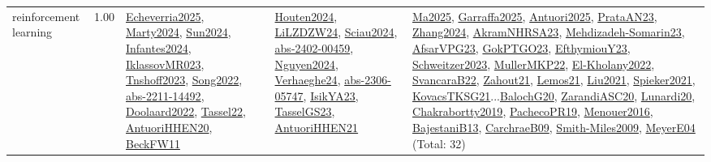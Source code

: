 {\begin{longtable}{p{3cm}r>{\raggedright\arraybackslash}p{6cm}>{\raggedright\arraybackslash}p{6cm}>{\raggedright\arraybackslash}p{8cm}}
\index{reinforcement learning}\index{Algorithms!reinforcement learning}reinforcement learning &  1.00 & \hyperref[detail:Echeverria2025]{Echeverria2025}, \hyperref[detail:Marty2024]{Marty2024}, \hyperref[detail:Sun2024]{Sun2024}, \hyperref[detail:Infantes2024]{Infantes2024}, \hyperref[detail:IklassovMR023]{IklassovMR023}, \hyperref[detail:Tnshoff2023]{Tnshoff2023}, \hyperref[detail:Song2022]{Song2022}, \hyperref[detail:abs-2211-14492]{abs-2211-14492}, \hyperref[detail:Doolaard2022]{Doolaard2022}, \hyperref[detail:Tassel22]{Tassel22}, \hyperref[detail:AntuoriHHEN20]{AntuoriHHEN20}, \hyperref[detail:BeckFW11]{BeckFW11} & \hyperref[detail:Houten2024]{Houten2024}, \hyperref[detail:LiLZDZW24]{LiLZDZW24}, \hyperref[detail:Sciau2024]{Sciau2024}, \hyperref[detail:abs-2402-00459]{abs-2402-00459}, \hyperref[detail:Nguyen2024]{Nguyen2024}, \hyperref[detail:Verhaeghe24]{Verhaeghe24}, \hyperref[detail:abs-2306-05747]{abs-2306-05747}, \hyperref[detail:IsikYA23]{IsikYA23}, \hyperref[detail:TasselGS23]{TasselGS23}, \hyperref[detail:AntuoriHHEN21]{AntuoriHHEN21} & \hyperref[detail:Ma2025]{Ma2025}, \hyperref[detail:Garraffa2025]{Garraffa2025}, \hyperref[detail:Antuori2025]{Antuori2025}, \hyperref[detail:PrataAN23]{PrataAN23}, \hyperref[detail:Zhang2024]{Zhang2024}, \hyperref[detail:AkramNHRSA23]{AkramNHRSA23}, \hyperref[detail:Mehdizadeh-Somarin23]{Mehdizadeh-Somarin23}, \hyperref[detail:AfsarVPG23]{AfsarVPG23}, \hyperref[detail:GokPTGO23]{GokPTGO23}, \hyperref[detail:EfthymiouY23]{EfthymiouY23}, \hyperref[detail:Schweitzer2023]{Schweitzer2023}, \hyperref[detail:MullerMKP22]{MullerMKP22}, \hyperref[detail:El-Kholany2022]{El-Kholany2022}, \hyperref[detail:SvancaraB22]{SvancaraB22}, \hyperref[detail:Zahout21]{Zahout21}, \hyperref[detail:Lemos21]{Lemos21}, \hyperref[detail:Liu2021]{Liu2021}, \hyperref[detail:Spieker2021]{Spieker2021}, \hyperref[detail:KovacsTKSG21]{KovacsTKSG21}...\hyperref[detail:BalochG20]{BalochG20}, \hyperref[detail:ZarandiASC20]{ZarandiASC20}, \hyperref[detail:Lunardi20]{Lunardi20}, \hyperref[detail:Chakrabortty2019]{Chakrabortty2019}, \hyperref[detail:PachecoPR19]{PachecoPR19}, \hyperref[detail:Menouer2016]{Menouer2016}, \hyperref[detail:BajestaniB13]{BajestaniB13}, \hyperref[detail:CarchraeB09]{CarchraeB09}, \hyperref[detail:Smith-Miles2009]{Smith-Miles2009}, \hyperref[detail:MeyerE04]{MeyerE04} (Total: 32)\\

\end{longtable}}
